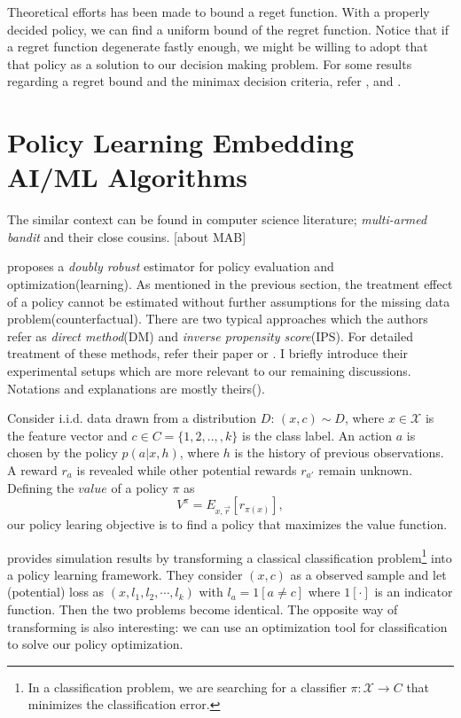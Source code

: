 \documentclass[11pt]{article}
\begin{document}
	 Theoretical efforts has been made to bound a reget function. With a properly decided policy, we can find a uniform bound of the regret function. Notice that if a regret function degenerate fastly enough, we might be willing to adopt that that policy as a solution to our decision making problem. For some results regarding a regret bound and the minimax decision criteria, refer \cite{Manski.2004} \cite{Stoye.2009},  and \cite{Hirano.2009}.

	\section{Policy Learning Embedding AI/ML Algorithms}
	The similar context can be found in computer science literature;  \textit{multi-armed bandit} and their close cousins. [about MAB]
	
	\cite{Dudik.2011} proposes a \textit{doubly robust} estimator for policy evaluation and optimization(learning). As mentioned in the previous section, the treatment effect of a policy cannot be estimated without further assumptions for the missing data problem(counterfactual). There are two typical approaches which the authors refer as \textit{direct method}(DM) and \textit{inverse propensity score}(IPS). For detailed treatment of these methods, refer their paper or \cite{imbens2015causal}. I briefly introduce their experimental setups which are more relevant to our remaining discussions. Notations and explanations are mostly theirs(\cite{Dudik.2011}).
	
	Consider i.i.d. data drawn from a distribution $D$: $(x,c) \sim D$, where $x\in \mathcal{X}$ is the feature vector and $c \in C = \{1,2,..,,k\}$ is the class label. An action $a$ is chosen by the policy $p(a|x,h)$, where $h$ is the history of previous observations. A reward $r_a$ is revealed while other potential rewards $r_{a'}$ remain unknown. Defining the $value$ of a policy $\pi$ as
	$$
	V^{\pi} = E_{x, \vec{r}}[r_{\pi(x)}],
	$$
	our policy learing objective is to find a policy that maximizes the value function.
	
	\cite{Dudik.2011} provides simulation results by transforming a classical classification problem\footnote{In a classification problem, we are searching for a classifier  $\pi: \mathcal{X} \rightarrow C$ that minimizes the classification error.} into a policy learning framework. They consider $(x,c)$ as a observed sample and let (potential) loss as $(x,l_1,l_2,\cdots,l_k)$ with $l_a = 1[a\neq c]$ where $1[\cdot]$ is an indicator function. Then the two problems become identical. The opposite way of transforming is also interesting: we can use an optimization tool for classification to solve our policy optimization.
	
\end{document}
